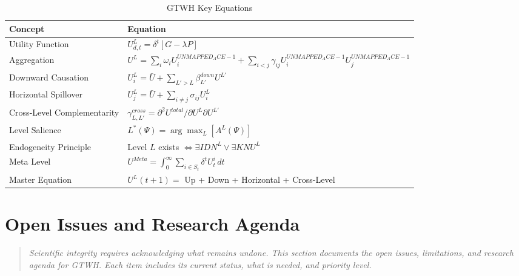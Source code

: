 \begin{table}[htbp]
\centering
\caption{GTWH Key Equations}
\label{tab:aaa-key-equations}
\renewcommand{\arraystretch}{1.4}
\small
\begin{tabular}{@{}p{4cm}p{8cm}@{}}
\toprule
\textbf{Concept} & \textbf{Equation} \\
\midrule
Utility Function & $U^L_{d,t} = \delta^t [G - \lambda P]$ \\
Aggregation & $U^L = \sum_i \omega_i U^{UNMAPPED_ACE-1}_i + \sum_{i<j} \gamma_{ij} U^{UNMAPPED_ACE-1}_i U^{UNMAPPED_ACE-1}_j$ \\
Downward Causation & $U^L_i = \bar{U} + \sum_{L'>L} \beta^{down}_{L'} U^{L'}$ \\
Horizontal Spillover & $U^L_j = \bar{U} + \sum_{i \neq j} \sigma_{ij} U^L_i$ \\
Cross-Level Complementarity & $\gamma^{cross}_{L,L'} = \partial^2 U^{total} / \partial U^L \partial U^{L'}$ \\
Level Salience & $L^*(\Psi) = \arg\max_L [A^L(\Psi)]$ \\
Endogeneity Principle & Level $L$ exists $\iff \exists IDN^L \lor \exists KNU^L$ \\
Meta Level & $U^{Meta} = \int_0^\infty \sum_{i \in S_t} \delta^t U^i_t \, dt$ \\
Master Equation & $U^L(t+1) = $ Up + Down + Horizontal + Cross-Level \\
\bottomrule
\end{tabular}
\end{table}



\section{Open Issues and Research Agenda}
\label{sec:aaa-open-issues}

\begin{quote}
\textit{Scientific integrity requires acknowledging what remains undone. This 
section documents the open issues, limitations, and research agenda for GTWH. 
Each item includes its current status, what is needed, and priority level.}
\end{quote}

